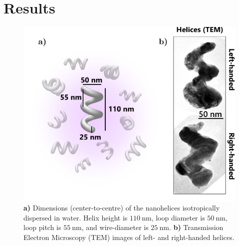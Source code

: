 \section{Results}

\begin{figure}[htb!]	
    \centering	
    \includegraphics[scale=1]{./figures/results/HRS/sample_schematic.pdf}
    \caption{\label{fig:results:HRS:sample_schematic}
    \textbf{a)} Dimensions (center-to-centre) of the nanohelices isotropically dispersed in water. Helix height is $\SI{110}{\nano\m}$, loop diameter is $\SI{50}{\nano\m}$, loop pitch is $\SI{55}{\nano\m}$, and wire-diameter is $\SI{25}{\nano\m}$. \textbf{b)} Transmission Electron Microscopy (TEM) images of left- and right-handed helices. }	
\end{figure}

